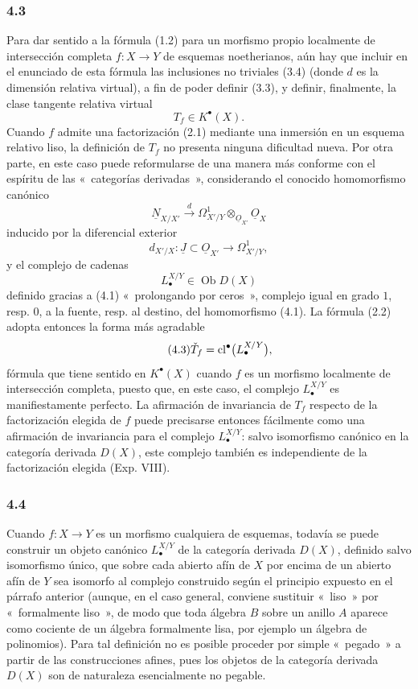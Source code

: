 \subsubsection*{4.3}
Para dar sentido a la fórmula (1.2) para un morfismo propio localmente de
intersección completa $f:X\to Y$ de esquemas noetherianos, aún hay que
incluir en el enunciado de esta fórmula las inclusiones no triviales (3.4)
(donde $d$ es la dimensión relativa virtual), a fin de poder definir (3.3),
y definir, finalmente, la clase tangente relativa virtual
\[
T_f\in K^\bullet(X).
\]
Cuando $f$ admite una factorización (2.1) mediante una inmersión en un
esquema relativo liso, la definición de $T_f$ no presenta ninguna dificultad
nueva. Por otra parte, en este caso puede reformularse de una manera más
conforme con el espíritu de las «~categorías derivadas~», considerando el
conocido homomorfismo canónico
\begin{equation}\tag{4.1}
\underline N_{X/X'}\xrightarrow{d}\Omega^1_{X'/Y}\otimes_{\underline O_{X'}}\underline O_X
\end{equation}
inducido por la diferencial exterior
\[
d_{X'/X}:\underline J\subset\underline O_{X'}\longrightarrow\Omega^1_{X'/Y},
\]
y el complejo de cadenas
\begin{equation}\tag{4.2}
L^{X/Y}_\bullet\in\operatorname{Ob}D(X)
\end{equation}
definido gracias a (4.1) «~prolongando por ceros~», complejo igual en grado
$1$, resp. $0$, a la fuente, resp. al destino, del homomorfismo (4.1). La
fórmula (2.2) adopta entonces la forma más agradable
\begin{equation}\tag{4.3}
\check T_f=\operatorname{cl}^\bullet\bigl(L^{X/Y}_\bullet\bigr),
\end{equation}
fórmula que tiene sentido en $K^\bullet(X)$ cuando $f$ es un morfismo
localmente de intersección completa, puesto que, en este caso, el complejo
$L^{X/Y}_\bullet$ es manifiestamente perfecto. La afirmación de invariancia
de $T_f$ respecto de la factorización elegida de $f$ puede precisarse
entonces fácilmente como una afirmación de invariancia para el complejo
$L^{X/Y}_\bullet$: salvo isomorfismo canónico en la categoría derivada
$D(X)$, este complejo también es independiente de la factorización elegida
(Exp. VIII).

\subsubsection*{4.4}
Cuando $f:X\to Y$ es un morfismo cualquiera de esquemas, todavía se puede
construir un objeto canónico $L^{X/Y}_\bullet$ de la categoría derivada
$D(X)$, definido salvo isomorfismo único, que sobre cada abierto afín de $X$
por encima de un abierto afín de $Y$ sea isomorfo al complejo construido
según el principio expuesto en el párrafo anterior (aunque, en el caso
general, conviene sustituir «~liso~» por «~formalmente liso~», de modo que
toda álgebra $B$ sobre un anillo $A$ aparece como cociente de un álgebra
formalmente lisa, por ejemplo un álgebra de polinomios). Para tal definición
no es posible proceder por simple «~pegado~» a partir de las construcciones
afines, pues los objetos de la categoría derivada $D(X)$ son de naturaleza
esencialmente no pegable.

